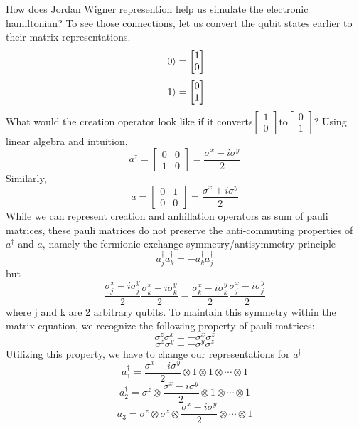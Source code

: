\documentclass{article}
\begin{document}
    How does Jordan Wigner represention help us simulate the electronic
    hamiltonian? To see those connections, let us convert the qubit
    states earlier to their matrix representations.
    \[
    \ket{0}
    =
    \begin{bmatrix}
        1 \\ 0
    \end{bmatrix}
    \]
    \[
    \ket{1}
    =
    \begin{bmatrix}
        0 \\ 1
    \end{bmatrix}
    \]
    What would the creation operator look like if it converts\( \begin{bmatrix}
      1 \\ 0
    \end{bmatrix}
    \)to\( \begin{bmatrix}
        0 \\ 1
    \end{bmatrix}\)?
    Using linear algebra and intuition,
    \[
    a^{\dagger} =
    \begin{bmatrix}
      0 & 0 \\ 1 & 0
  \end{bmatrix}
    =
    \frac{\sigma^{x} - i\sigma^{y} }{2}
    \]
    Similarly,
    \[
    a =
    \begin{bmatrix}
      0 & 1 \\ 0 & 0
  \end{bmatrix}
    =
    \frac{\sigma^{x} + i\sigma^{y} }{2}
    \]
    While we can represent creation and anhillation operators as sum of
    pauli matrices, these pauli matrices do not preserve the anti-commuting
    properties of \(a^{\dagger}\) and \(a\), namely the fermionic
    exchange symmetry/antisymmetry principle
    \[a^{\dagger}_{j}a^{\dagger}_{k} = -a^{\dagger}_{k}a^{\dagger}_{j}\]
    but
    \[\frac{\sigma^{x}_j - i\sigma^{y}_j }{2}\frac{\sigma^{x}_k - i\sigma^{y}_k }{2}
    = \frac{\sigma^{x}_k - i\sigma^{y}_k }{2}\frac{\sigma^{x}_{j} - i\sigma^{y}_j }{2}\]
    where j and k are 2 arbitrary qubits. To maintain this symmetry within the
    matrix equation, we recognize the following property of pauli matrices:
    \[\sigma^{z}\sigma^{x} = -\sigma^{x}\sigma^{z}\]
    \[\sigma^{z}\sigma^{y} = -\sigma^{y}\sigma^{z}\]
    Utilizing this property, we have to change our representations for
    \(a^{\dagger}\)
    \[a^{\dagger}_1 = \frac{\sigma^{x} - i\sigma^{y} }{2}\otimes 1\otimes 1
    \otimes\cdots\otimes 1\]
    \[a^{\dagger}_2 = \sigma^{z}\otimes\frac{\sigma^{x} - i\sigma^{y} }{2}\otimes 1
    \otimes\cdots\otimes 1\]
    \[a^{\dagger}_3 = \sigma^{z}\otimes\sigma^{z}\otimes\frac{\sigma^{x} - i\sigma^{y} }{2}
    \otimes\cdots\otimes 1\]
\end{document}
